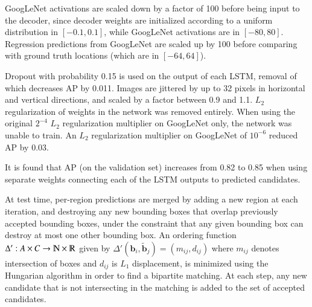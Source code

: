 \documentclass[a4paper, 12pt]{article}
\begin{document}
GoogLeNet activations are scaled down by a factor of 100 before being input to
the decoder, since decoder weights are initialized according to a uniform
distribution in $[-0.1, 0.1]$, while GoogLeNet activations are in $[-80, 80]$.
Regression predictions from GoogLeNet are scaled up by 100 before comparing
with ground truth locations (which are in $[-64, 64]$).

Dropout with probability 0.15 is used on the output of each LSTM, removal of
which decreases AP by 0.011. Images are jittered by up to 32 pixels in
horizontal and vertical directions, and scaled by a factor between 0.9 and 1.1.
$L_2$ regularization of weights in the network was removed entirely. When using
the original $2^{-4}$ $L_2$ regularization multiplier on GoogLeNet only, the
network was unable to train. An $L_2$ regularization multiplier on GoogLeNet of
$10^{-6}$ reduced AP by 0.03.

It is found that AP (on the validation set) increases from 0.82 to 0.85 when
using separate weights connecting each of the LSTM outputs to predicted
candidates.

At test time, per-region predictions are merged by adding a new region at each
iteration, and destroying any new bounding boxes that overlap previously
accepted bounding boxes, under the constraint that any given bounding box can
destroy at most one other bounding box. An ordering function
$\Delta': A \times C \rightarrow \varmathbb{N} \times \varmathbb{R}$ given by
$\Delta'(\boldsymbol{b}_i, \tilde{\boldsymbol{b}}_j) = (m_{ij}, d_{ij})$ where
$m_{ij}$ denotes intersection of boxes and $d_{ij}$ is $L_1$ displacement, is
minimized using the Hungarian algorithm in order to find a bipartite matching.
At each step, any new candidate that is not intersecting in the matching is
added to the set of accepted candidates.



\end{document}
